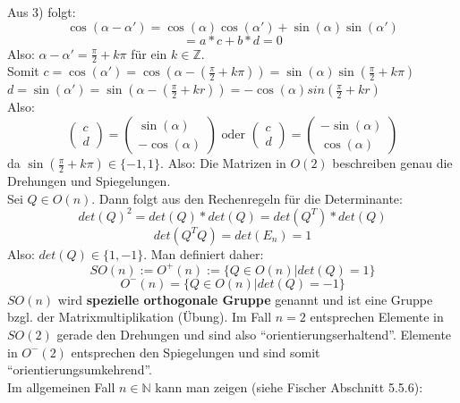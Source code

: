 \documentclass{scrbook}
\begin{document}
Aus 3) folgt:
\[\cos(\alpha -\alpha') = \cos(\alpha)\cos(\alpha')+\sin(\alpha)\sin(\alpha')\]
\[=a*c+b*d = 0\]
Also: $\alpha -\alpha' = \frac{\pi}{2} + k \pi$ für ein $k \in \mathbb{Z}$.\\
Somit $c = \cos(\alpha') = \cos(\alpha-(\frac{\pi}{2}+k\pi)) = \sin(\alpha) \sin(\frac{\pi}{2} + k\pi)$\\
$d = \sin(\alpha') = \sin(\alpha-(\frac{\pi}{2}+ kr)) = -\cos(\alpha)sin(\frac{\pi}{2}+kr)$\\
Also:
\[
\left(
\begin{array}{c}
c\\d
\end{array}
\right)
=
\left(
\begin{array}{c}
\sin(\alpha)\\-\cos(\alpha)
\end{array}
\right)
\text{ oder } \left(
\begin{array}{c}
c\\d
\end{array}
\right)
=
\left(
\begin{array}{c}
-\sin(\alpha)\\\cos(\alpha)
\end{array}
\right)\]
da $\sin (\frac{\pi}{2}+ k\pi) \in \{-1,1\}$.
Also: Die Matrizen in $O(2)$ beschreiben genau die Drehungen und Spiegelungen.\\
Sei $Q\in O(n)$. Dann folgt aus den Rechenregeln für die Determinante:
\[det(Q)^2 = det(Q)*det(Q) = det(Q^T)*det(Q)\]
\[det(Q^TQ) = det(E_n) = 1\]
Also: $det(Q) \in \{1,-1\}$.
Man definiert daher:
\[SO(n) := O^+(n) := \{Q\in O(n)|det(Q) = 1\}\]
\[O^- (n) = \{Q\in O(n)|det(Q) = -1\}\]
$SO(n)$ wird \textbf{spezielle orthogonale Gruppe} genannt und ist eine Gruppe bzgl. der Matrixmultiplikation (Übung). Im Fall $n=2$ entsprechen Elemente in $SO(2)$ gerade den Drehungen und sind also "`orientierungserhaltend"'. Elemente in $O^-(2)$ entsprechen den Spiegelungen und sind somit "`orientierungsumkehrend"'.\\
Im allgemeinen Fall $n\in \mathbb{N}$ kann man zeigen (siehe Fischer Abschnitt 5.5.6): \\
\end{document}

